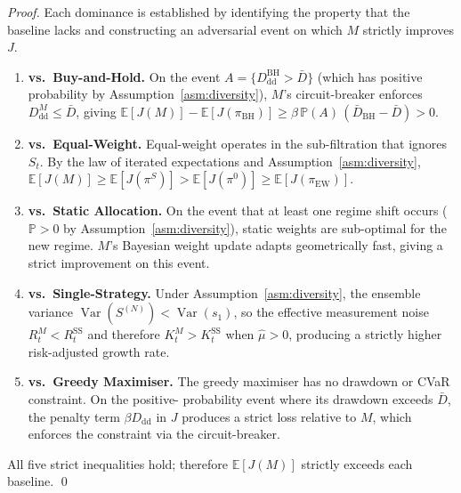 \documentclass[12pt,openany]{book}
\newcommand{\Prob}{\mathbb{P}}
\DeclareMathOperator{\Var}{Var}
\numberwithin{equation}{chapter}
\theoremstyle{plain}
\theoremstyle{definition}
\theoremstyle{remark}
\def\mathcal#1{#1}%
\begin{document}
\begin{proof}
Each dominance is established by identifying the property that
the baseline lacks and constructing an adversarial event on
which $\mathcal{M}$ strictly improves $J$.

\begin{enumerate}[leftmargin=*, label=\textbf{Step~\arabic*.}]
  \item \textbf{vs.\ Buy-and-Hold.}  On the event
        $A = \{D_{\mathrm{dd}}^{\mathrm{BH}} > \bar{D}\}$ (which
        has positive probability by Assumption~\ref{asm:diversity}),
        $\mathcal{M}$'s circuit-breaker enforces
        $D_{\mathrm{dd}}^{\mathcal{M}} \leq \bar{D}$, giving
        $\mathbb{E}[J(\mathcal{M})] - \mathbb{E}[J(\pi_{\mathrm{BH}})]
        \geq \beta\,\Prob(A)\,(\bar{D}_{\mathrm{BH}} - \bar{D}) > 0$.

  \item \textbf{vs.\ Equal-Weight.}  Equal-weight operates in
        the sub-filtration that ignores $S_t$.  By the law of
        iterated expectations and Assumption~\ref{asm:diversity},
        $\mathbb{E}[J(\mathcal{M})] \geq \mathbb{E}[J(\pi^S)] >
        \mathbb{E}[J(\pi^0)] \geq \mathbb{E}[J(\pi_{\mathrm{EW}})]$.

  \item \textbf{vs.\ Static Allocation.}  On the event that at
        least one regime shift occurs ($\Prob > 0$ by
        Assumption~\ref{asm:diversity}), static weights are
        sub-optimal for the new regime.  $\mathcal{M}$'s Bayesian
        weight update adapts geometrically fast, giving a strict
        improvement on this event.

  \item \textbf{vs.\ Single-Strategy.}  Under
        Assumption~\ref{asm:diversity}, the ensemble variance
        $\Var(S^{(N)}) < \Var(s_1)$, so the effective measurement
        noise $R_t^{\mathcal{M}} < R_t^{\mathrm{SS}}$ and therefore
        $K_t^{\mathcal{M}} > K_t^{\mathrm{SS}}$ when
        $\hat{\mu} > 0$, producing a strictly higher risk-adjusted
        growth rate.

  \item \textbf{vs.\ Greedy Maximiser.}  The greedy maximiser
        has no drawdown or CVaR constraint.  On the positive-
        probability event where its drawdown exceeds $\bar{D}$,
        the penalty term $\beta D_{\mathrm{dd}}$ in $J$ produces
        a strict loss relative to $\mathcal{M}$, which enforces
        the constraint via the circuit-breaker.
\end{enumerate}
All five strict inequalities hold; therefore $\mathbb{E}[J(\mathcal{M})]$
strictly exceeds each baseline.
\qed
\end{proof}
\end{document}
